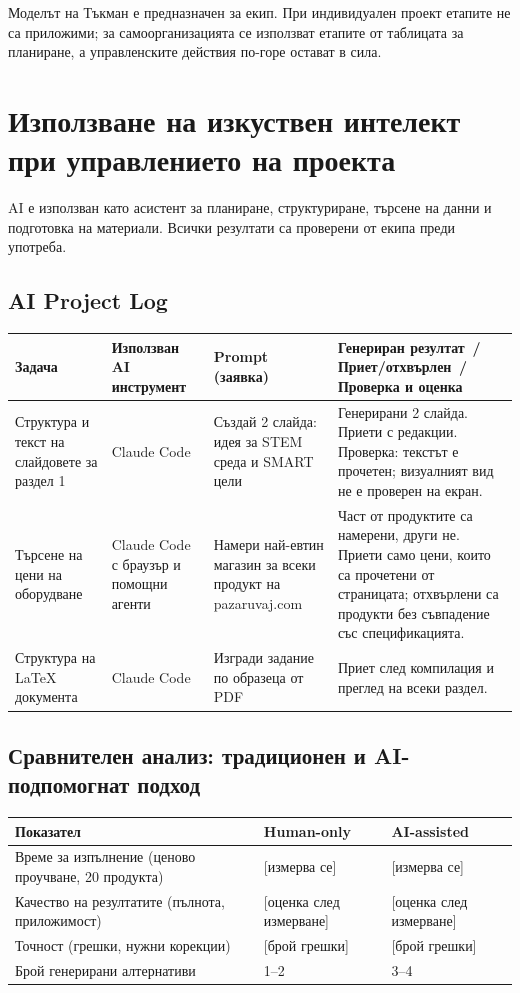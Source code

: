 \documentclass[11pt,a4paper]{article}
\newcommand{\todo}[1]{\textcolor{todo}{[#1]}}
\begin{document}
Моделът на Тъкман е предназначен за екип. При индивидуален проект етапите не са приложими; за самоорганизацията се използват етапите от таблицата за планиране, а управленските действия по-горе остават в сила.

\section{Използване на изкуствен интелект при управлението на проекта}

AI е използван като асистент за планиране, структуриране, търсене на данни и подготовка на материали. Всички резултати са проверени от екипа преди употреба.

\subsection{AI Project Log}

\begin{tabularx}{\textwidth}{@{}>{\raggedright\arraybackslash}p{3.4cm}>{\raggedright\arraybackslash}p{3cm}>{\raggedright\arraybackslash}p{3.8cm}X@{}}
\toprule
Задача & Използван AI инструмент & Prompt (заявка) & Генериран резултат \,/\, Приет/отхвърлен \,/\, Проверка и оценка \\
\midrule
Структура и текст на слайдовете за раздел 1 & Claude Code & Създай 2 слайда: идея за STEM среда и SMART цели & Генерирани 2 слайда. Приети с редакции. Проверка: текстът е прочетен; визуалният вид не е проверен на екран. \\
Търсене на цени на оборудване & Claude Code с браузър и помощни агенти & Намери най-евтин магазин за всеки продукт на pazaruvaj.com & Част от продуктите са намерени, други не. Приети само цени, които са прочетени от страницата; отхвърлени са продукти без съвпадение със спецификацията. \\
Структура на LaTeX документа & Claude Code & Изгради задание по образеца от PDF & Приет след компилация и преглед на всеки раздел. \\
\bottomrule
\end{tabularx}

\subsection{Сравнителен анализ: традиционен и AI-подпомогнат подход}

\begin{tabularx}{\textwidth}{@{}>{\raggedright\arraybackslash}p{4.4cm}XX@{}}
\toprule
Показател & Human-only & AI-assisted \\
\midrule
Време за изпълнение (ценово проучване, 20 продукта) & \todo{измерва се} & \todo{измерва се} \\
Качество на резултатите (пълнота, приложимост) & \todo{оценка след измерване} & \todo{оценка след измерване} \\
Точност (грешки, нужни корекции) & \todo{брой грешки} & \todo{брой грешки} \\
Брой генерирани алтернативи & 1--2 & 3--4 \\
\bottomrule
\end{tabularx}
\end{document}
